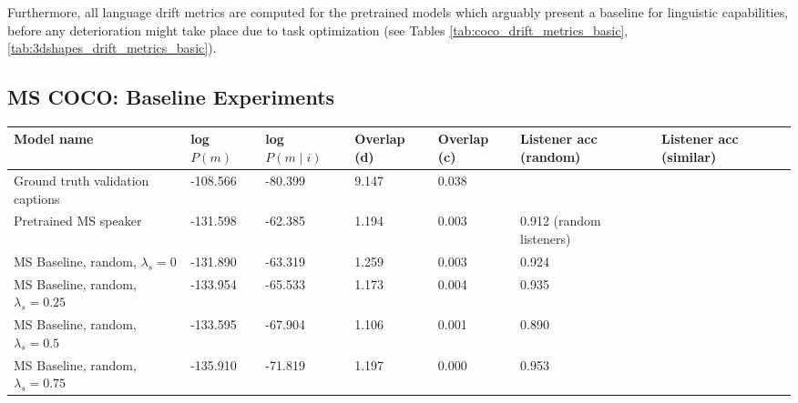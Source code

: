 Furthermore, all language drift metrics are computed for the pretrained models which arguably present a baseline for linguistic capabilities, before any deterioration might take place due to task optimization (see Tables \ref{tab:coco_drift_metrics_basic}, \ref{tab:3dshapes_drift_metrics_basic}).

\subsection{MS COCO: Baseline Experiments}
\label{expt:coco_baseline}

\begin{table}[]
	\begin{tabularx}{\textwidth}{|X|l|l|X|X|X|X|}
		\hline
		\textbf{Model name}                                    & \textbf{log $P(m)$} & \textbf{log $P(m \mid i)$} & \textbf{Overlap (d)} & \textbf{Overlap (c)} & \textbf{Listener acc (random)} & \textbf{Listener acc (similar)} \\ \hline
		Ground truth validation captions               &     -108.566            &          -80.399             &    9.147           &       0.038          &            &                           \\ \hline
		Pretrained MS speaker               &      -131.598            &           -62.385             &          1.194            &           0.003           & 0.912 (random listeners)                 &                                           \\ \hline
		MS Baseline, random, $\lambda_s = 0$      &     -131.890              &         -63.319               &        1.259       &         0.003             &             0.924                             &                                           \\ \hline
		MS Baseline, random, $\lambda_s = 0.25$    &      -133.954             &          -65.533              &          1.173            &       0.004               &           0.935                               &                                           \\ \hline
		MS Baseline, random, $\lambda_s = 0.5$      &         -133.595         &           -67.904             &        1.106              &        0.001              &             0.890                             &                                           \\ \hline
		MS Baseline, random, $\lambda_s = 0.75$   &       -135.910            &             -71.819          &        1.197              &        0.000              & 0.953                                    &                                           \\ \hline

\end{tabularx}
\end{table}
